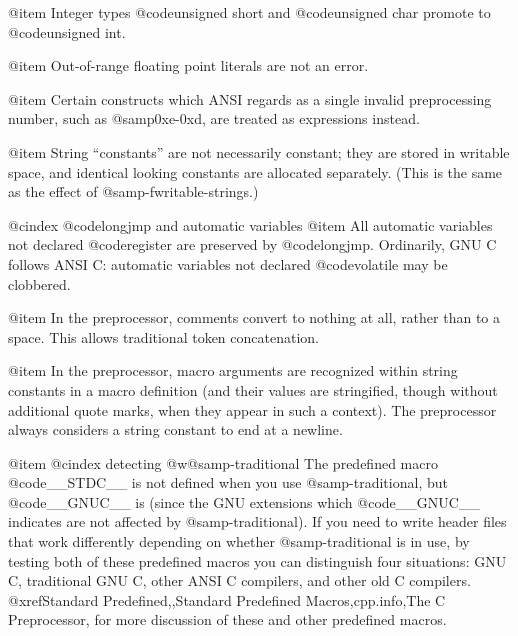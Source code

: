 @item
Integer types @code{unsigned short} and @code{unsigned char} promote
to @code{unsigned int}.

@item
Out-of-range floating point literals are not an error.

@item
Certain constructs which ANSI regards as a single invalid preprocessing
number, such as @samp{0xe-0xd}, are treated as expressions instead.

@item
String ``constants'' are not necessarily constant; they are stored in
writable space, and identical looking constants are allocated
separately.  (This is the same as the effect of
@samp{-fwritable-strings}.)

@cindex @code{longjmp} and automatic variables
@item
All automatic variables not declared @code{register} are preserved by
@code{longjmp}.  Ordinarily, GNU C follows ANSI C: automatic variables
not declared @code{volatile} may be clobbered.

@item
In the preprocessor, comments convert to nothing at all, rather than
to a space.  This allows traditional token concatenation.

@item
In the preprocessor, macro arguments are recognized within string
constants in a macro definition (and their values are stringified,
though without additional quote marks, when they appear in such a
context).  The preprocessor always considers a string constant to end
at a newline.

@item
@cindex detecting @w{@samp{-traditional}}
The predefined macro @code{__STDC__} is not defined when you use
@samp{-traditional}, but @code{__GNUC__} is (since the GNU extensions
which @code{__GNUC__} indicates are not affected by
@samp{-traditional}).  If you need to write header files that work
differently depending on whether @samp{-traditional} is in use, by
testing both of these predefined macros you can distinguish four
situations: GNU C, traditional GNU C, other ANSI C compilers, and other
old C compilers.  @xref{Standard Predefined,,Standard Predefined
Macros,cpp.info,The C Preprocessor}, for more discussion of these and other
predefined macros.

